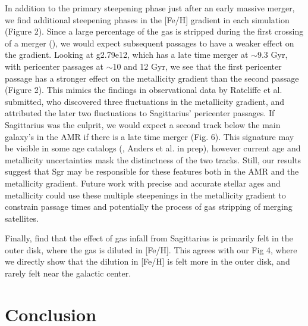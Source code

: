 \documentclass[useAMS,usenatbib]{mnras}
\begin{document}
In addition to the primary steepening phase just after an early massive merger, we find additional steepening phases in the [Fe/H] gradient in each simulation (Figure 2).  Since a large percentage of the gas is stripped during the first crossing of a merger (\citealt{TepperGarcia2018}), we would expect subsequent passages to have a weaker effect on the gradient. Looking at g2.79e12, which has a late time merger at $\sim$9.3 Gyr, with pericenter passages at $\sim$10 and 12 Gyr, we see that the first pericenter passage has a stronger effect on the metallicity gradient than the second passage (Figure 2). This mimics the findings in observational data by Ratcliffe et al. submitted, who discovered three fluctuations in the metallicity gradient, and attributed the later two fluctuations to Sagittarius’ pericenter passages. If Sagittarius was the culprit, we would expect a second track below the main galaxy's in the AMR if there is a late time merger (Fig. 6). This signature may be visible in some age catalogs (\citealt{Xiang2022}, Anders et al. in prep), however current age and metallicity uncertainties mask the distinctness of the two tracks. Still, our results suggest that Sgr may be responsible for these features both in the AMR and the metallicity gradient. Future work with precise and accurate stellar ages and metallicity could use these multiple steepenings in the metallicity gradient to constrain passage times and potentially the process of gas stripping of merging satellites.

Finally, \cite{Annem2022} find that the effect of gas infall from Sagittarius is primarily felt in the outer disk, where the gas is diluted in [Fe/H]. This agrees with our Fig 4, where we directly show that the dilution in [Fe/H] is felt more in the outer disk, and rarely felt near the galactic center.


\section{Conclusion}
\label{sec:conclusion}
\end{document}
